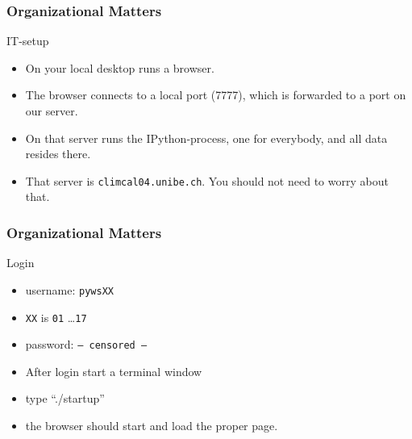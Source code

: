 \documentclass[xcolor=pdftex,dvipsnames,table]{beamer}
\begin{document}
\begin{frame}
  \frametitle{Organizational Matters}

  \begin{block}{IT-setup}
     {
      \footnotesize
      \begin{itemize}
      \item On your local desktop runs a browser.
      \item The browser connects to a local port (7777), which is forwarded to a port on our server.
      \item On that server runs the IPython-process, one for everybody, and all data resides there.
      \item That server is \texttt{climcal04.unibe.ch}. You should not need to worry about that.
      \end{itemize}
    }
  \end{block}

\end{frame}

\begin{frame}
  \frametitle{Organizational Matters}
  \begin{block}{Login}
    \begin{itemize}
      \item username: \texttt{pywsXX}
      \item \texttt{XX} is \texttt{01} \ldots \texttt{17}  
      \item password: \texttt{--- censored ---}
      \item After login start a terminal window
      \item type ``./startup''
      \item the browser should start and load the proper page.
    \end{itemize}
  \end{block}
\end{frame}
\end{document}

